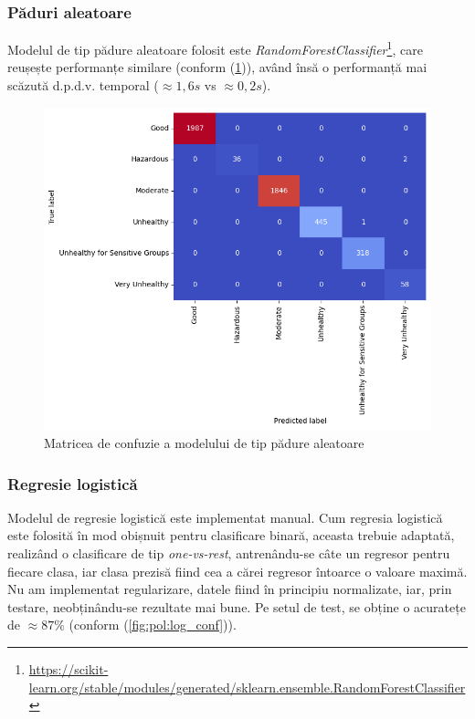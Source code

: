 \documentclass{article}
\begin{document}
\subsubsection{Păduri aleatoare}

Modelul de tip pădure aleatoare folosit este
\textit{RandomForestClassifier}\footnote{
    \url{https://scikit-learn.org/stable/modules/generated/sklearn.ensemble.RandomForestClassifier}
}, care reușește performanțe similare (conform (\ref{fig:pol:rf_conf})), 
având însă o performanță mai scăzută d.p.d.v. temporal ($\approx 1,6s$ vs 
$\approx 0,2s$).

\begin{figure}[ht]
    \centering
    \includegraphics[scale=0.5]{air_pollution/learning/random_forest_conf.png}
    \caption{Matricea de confuzie a modelului de tip pădure aleatoare}
    \label{fig:pol:rf_conf}
\end{figure}

\subsubsection{Regresie logistică}\label{sec:pol:reg}
Modelul de regresie logistică este implementat manual. Cum regresia logistică
este folosită în mod obișnuit pentru clasificare binară, aceasta trebuie 
adaptată, realizând o clasificare de tip \textit{one-vs-rest}, antrenându-se 
câte un regresor pentru fiecare clasa, iar clasa prezisă fiind cea a cărei 
regresor întoarce o valoare maximă. Nu am implementat regularizare, datele fiind
în principiu normalizate, iar, prin testare, neobținându-se rezultate mai bune.
Pe setul de test, se obține o acuratețe de $\approx 87\%$ (conform 
(\ref{fig:pol:log_conf})).
\end{document}

